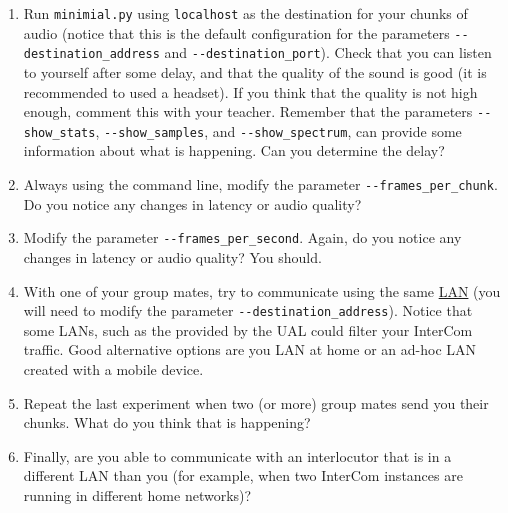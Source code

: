 \begin{enumerate}
\item Run \texttt{minimial.py} using \texttt{localhost} as the
  destination for your chunks of audio (notice that this is the
  default configuration for the parameters
  \verb|--destination_address| and \verb|--destination_port|). Check
  that you can listen to yourself after some delay, and that the
  quality of the sound is good (it is recommended to used a
  headset). If you think that the quality is not high enough, comment
  this with your teacher. Remember that the parameters
  \verb|--show_stats|, \verb|--show_samples|, and
  \verb|--show_spectrum|, can provide some information about what is
  happening. Can you determine the delay?
\item Always using the command line, modify the parameter
  \verb|--frames_per_chunk|. Do you notice any changes in latency
  or audio quality?
\item Modify the parameter \verb|--frames_per_second|. Again, do
  you notice any changes in latency or audio quality? You should.
\item With one of your group mates, try to communicate using the same
  \href{https://en.wikipedia.org/wiki/Local_area_network}{LAN} (you
  will need to modify the parameter
  \verb|--destination_address|). Notice that some LANs, such as the
  provided by the UAL could filter your InterCom traffic. Good
  alternative options are you LAN at home or an ad-hoc LAN created
  with a mobile device.
\item Repeat the last experiment when two (or more) group mates send
  you their chunks. What do you think that is happening?
\item Finally, are you able to communicate with an interlocutor that
  is in a different LAN than you (for example, when two InterCom
  instances are running in different home networks)?
\end{enumerate}

